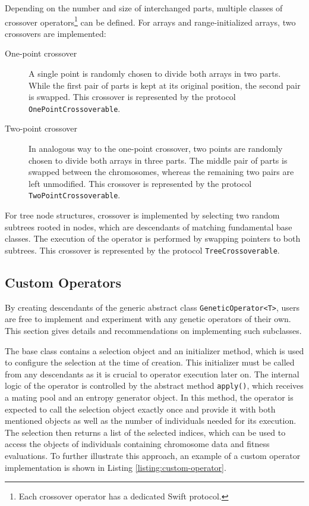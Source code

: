 \todo %
Depending on the number and size of interchanged parts, multiple classes of crossover operators\footnote{Each crossover operator has a dedicated Swift protocol.} can be defined. For arrays and range-initialized arrays, two crossovers are implemented:
~
\begin{description}
	\item[One-point crossover]
	A single point is randomly chosen to divide both arrays in two parts. While the first pair of parts is kept at its original position, the second pair is swapped. This crossover is represented by the protocol \texttt{OnePointCrossoverable}.

	\item[Two-point crossover]
	In analogous way to the one-point crossover, two points are randomly chosen to divide both arrays in three parts. The middle pair of parts is swapped between the chromosomes, whereas the remaining two pairs are left unmodified. This crossover is represented by the protocol \texttt{TwoPointCrossoverable}.
\end{description}

For tree node structures, crossover is implemented by selecting two random subtrees rooted in nodes, which are descendants of matching fundamental base classes. The execution of the operator is performed by swapping pointers to both subtrees. This crossover is represented by the protocol \texttt{TreeCrossoverable}.

\todo %

\subsection{Custom Operators}\label{section:custom-operators}
By creating descendants of the generic abstract class \texttt{GeneticOperator<T>}, users are free to implement and experiment with any genetic operators of their own. This section gives details and recommendations on implementing such subclasses.

The base class contains a selection object and an initializer method, which is used to configure the selection at the time of creation. This initializer must be called from any descendants as it is crucial to operator execution later on. The internal logic of the operator is controlled by the abstract method \texttt{apply()}, which receives a mating pool and an entropy generator object. In this method, the operator is expected to call the selection object exactly once and provide it with both mentioned objects as well as the number of individuals needed for its execution. The selection then returns a list of the selected indices, which can be used to access the objects of individuals containing chromosome data and fitness evaluations. To further illustrate this approach, an example of a custom operator implementation is shown in Listing \ref{listing:custom-operator}.

